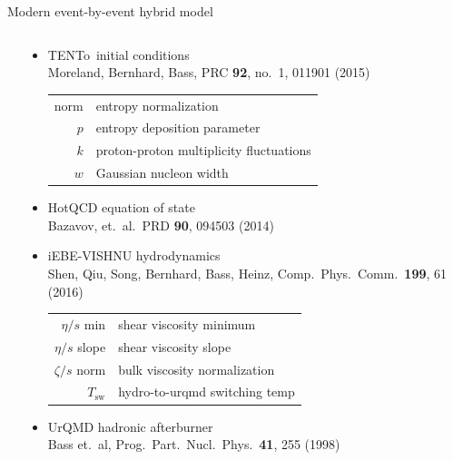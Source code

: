 \documentclass[xcolor=dvipsnames, aspectratio=169]{beamer}
\newcommand{\trento}{T\raisebox{-0.3ex}{R}ENTo}
\begin{document}
\begin{frame}{Modern event-by-event hybrid model}
    \smallskip
    \begin{columns}
    \begin{column}{0.05\textwidth}
    \end{column}
    \begin{column}{0.95\textwidth}
    \begin{itemize}
        \item \trento\ initial conditions \\
        {\scriptsize Moreland, Bernhard, Bass, PRC {\bf 92}, 
         no.\ 1, 011901 (2015)} \\
        \begin{table}
            \scriptsize \flushleft
            \begin{tabular}{r l}
                norm & entropy normalization \\ 
                $p$ & entropy deposition parameter \\
                $k$ & proton-proton multiplicity fluctuations \\
                $w$ & Gaussian nucleon width
            \end{tabular}
        \end{table}
        \smallskip
        \item HotQCD equation of state \\
        {\scriptsize Bazavov, et.\ al.\ PRD {\bf 90}, 
         094503 (2014)} \\
        \smallskip 
        \item iEBE-VISHNU hydrodynamics \\
        {\scriptsize Shen, Qiu, Song, Bernhard, Bass, Heinz, 
         Comp.\ Phys.\ Comm.\ {\bf 199}, 61 (2016)}  
        \begin{table}
            \scriptsize \flushleft
            \begin{tabular}{r l}
                $\eta/s$ min & shear viscosity minimum \\ 
                $\eta/s$ slope & shear viscosity slope \\
                $\zeta/s$ norm & bulk viscosity normalization \\
                $T_\text{sw}$ & hydro-to-urqmd switching temp
            \end{tabular}
        \end{table}
        \smallskip
        \item UrQMD hadronic afterburner \\
        {\scriptsize Bass et.\ al, Prog.\ Part.\ Nucl.\ Phys.\ 
         {\bf 41}, 255 (1998)}
    \end{itemize}
    \end{column}
    \end{columns}
\end{frame}
\end{document}

